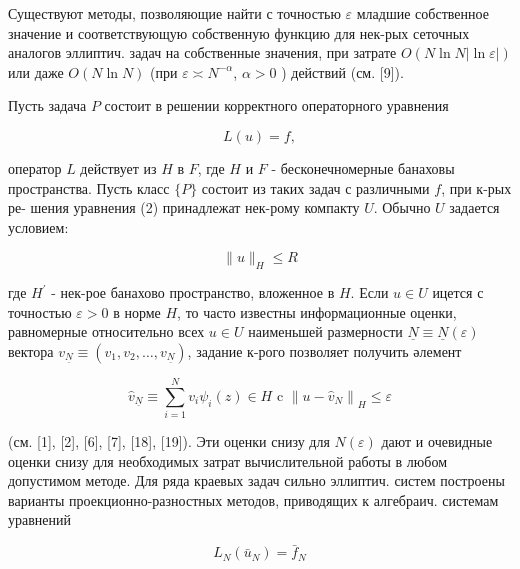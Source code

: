 \documentclass[10pt]{article}
\begin{document}
Существуют методы, позволяющие найти с точностью $\varepsilon$ младшие собственное значение и соответствующую собственную функцию для нек-рых сеточных аналогов эллиптич. задач на собственные значения, при затрате $O(N \ln N|\ln \varepsilon|)$ или даже $O(N \ln N)$ (при $\varepsilon \asymp N^{-\alpha}$, $\alpha>0$ ) действий (см. [9]).



Пусть задача $P$ состоит в решении корректного операторного уравнения



\[

L(u)=f,

\]



оператор $L$ действует из $H$ в $F$, где $H$ и $F$ - бесконечномерные банаховы пространства. Пусть класс $\{P\}$ состоит из таких задач с различными $f$, при к-рых ре- шения уравнения (2) принадлежат нек-рому компакту $U$. Обычно $U$ задается условием:



\[

\|u\|_{H} \leqslant R

\]



где $H^{\prime}$ - нек-рое банахово пространство, вложенное в $H$. Если $u \in U$ ицется с точностью $\varepsilon>0$ в норме $H$, то часто известны информационные оценки, равномерные относительно всех $u \in U$ наименьшей размерности $\underline{N} \equiv \underline{N}(\varepsilon)$ вектора $v_{\underline{N}} \equiv\left(v_{1}, v_{2}, \ldots, v_{\underline{N}}\right)$, задание к-рого позволяет получить әлемент



\[

\hat{v}_{\underline{N}} \equiv \sum_{i=1}^{N} v_{i} \psi_{i}(z) \in H \text { c }\left\|u-\hat{v}_{N}\right\|_{H} \leqslant \varepsilon

\]



(см. [1], [2], [6], [7], [18], [19]). Эти оценки снизу для $N(\varepsilon)$ дают и очевидные оценки снизу для необходимых затрат вычислительной работы в любом допустимом методе. Для ряда краевых задач сильно эллиптич. систем построены варианты проекционно-разностных методов, приводящих к алгебраич. системам уравнений



\[

L_{N}\left(\bar{u}_{N}\right)=\bar{f}_{N}

\]
\end{document}
